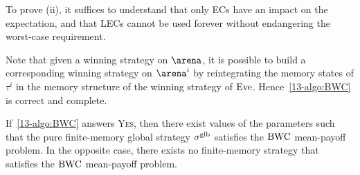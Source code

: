 To prove (ii), it suffices to understand that only ECs have an impact on the expectation, and that LECs cannot be used forever without endangering the worst-case requirement.

Note that given a winning strategy on $\arena$, it is possible to build a corresponding winning strategy on $\arena^{i}$ by reintegrating the memory states of $\tau^i$ in the memory structure of the winning strategy of $\text{Eve}$. Hence~\cref{13-algo:BWC} is correct and complete.

\begin{theorem}
\label{13-thm:bwcCorrectAndComplete}
If~\cref{13-algo:BWC} answers \textsc{Yes}, then there exist values of the parameters such that the pure finite-memory global strategy $\sigma^{\text{glb}}$ satisfies the $\text{BWC}$ mean-payoff problem. In the opposite case, there exists no finite-memory strategy that satisfies the $\text{BWC}$ mean-payoff problem.
\end{theorem}



